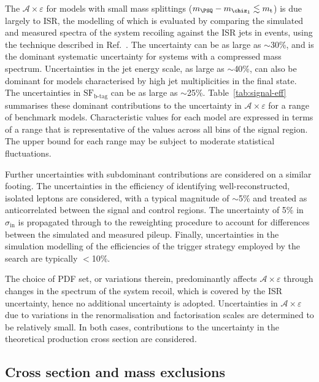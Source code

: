 The $\mathcal{A}\times\varepsilon$ for models with small mass
splittings (\eg $m_{\PSQ} - m_{\chiz_1} \lesssim m_{\text t}$) is due
largely to ISR, the modelling of which is evaluated by comparing the
simulated and measured \Pt spectra of the system recoiling against the
ISR jets in \ttbar events, using the technique described in
Ref.~\cite{single-lepton-stop}. The uncertainty can be as large as
$\sim$30\%, and is the dominant systematic uncertainty for systems
with a compressed mass spectrum. Uncertainties in the jet energy
scale, as large as $\sim$40\%, can also be dominant for models
characterised by high jet multiplicities in the final state. The
uncertainties in $\text{SF}_\text{b-tag}$ can be as large as
$\sim$25\%. Table~\ref{tab:signal-eff} summarises these dominant
contributions to the uncertainty in $\mathcal{A}\times\varepsilon$ for
a range of benchmark models. Characteristic values for each model are
expressed in terms of a range that is representative of the values
across all bins of the signal region. The upper bound for each range
may be subject to moderate statistical fluctuations.

Further uncertainties with subdominant contributions are considered on
a similar footing. The uncertainties in the efficiency of identifying
well-reconstructed, isolated leptons are considered, with a typical
magnitude of $\sim$5\% and treated as anticorrelated between the
signal and control regions. The uncertainty of 5\% in
$\sigma_\text{in}$ is propagated through to the reweighting procedure
to account for differences between the simulated and measured
pileup. Finally, uncertainties in the simulation modelling of the
efficiencies of the trigger strategy employed by the search are
typically $<$10\%. 

The choice of PDF set, or variations therein, predominantly affects
$\mathcal{A}\times\varepsilon$ through changes in the \Pt spectrum of
the system recoil, which is covered by the ISR uncertainty, hence no
additional uncertainty is adopted. Uncertainties in
$\mathcal{A}\times\varepsilon$ due to variations in the
renormalisation and factorisation scales are determined to be
relatively small. In both cases, contributions to the uncertainty in
the theoretical production cross section are considered.

\subsection{Cross section and mass exclusions}


